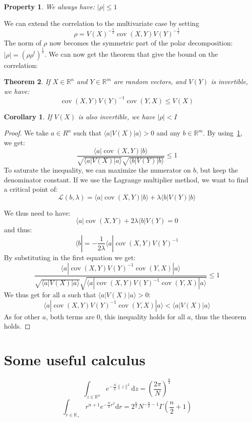 \documentclass[10pt,a4paper]{report}
\theoremstyle{plain}
\newtheorem{thm}{Theorem}[chapter]
\newtheorem{prop}[thm]{Property}
\newtheorem{cor}{Corollary}[thm]
\theoremstyle{definition}
\theoremstyle{remark}
\newcommand{\R}{\ensuremath{\mathbb{R}}}
\newcommand{\ket}[1]{|#1\rangle}
\newcommand{\bra}[1]{\langle#1|}
\newcommand{\dd}{\mathrm{d}}
\renewcommand{\leq}{\leqslant}
\DeclareMathOperator{\cov}{cov}
\begin{document}
\begin{prop}\label{prop:correl1}
  We always have: $|\rho| \le 1$
\end{prop}

We can extend the correlation to the multivariate case by setting
\[\rho = {V(X)}^{-\frac12}\cov(X,Y){V(Y)}^{-\frac12}\]
The norm of $\rho$ now becomes the symmetric part of the polar decomposition:  $|\rho|
= {(\rho\rho^t)}^{\frac12}$. We can now get the theorem that give the bound on the
correlation:

\begin{thm}\label{thm:correln}
  If $X \in \R^n$ and $Y \in \R^m$ are random vectors, and $V(Y)$ is invertible,
  we have:
  \[\cov(X,Y){V(Y)}^{-1}\cov(Y,X) \leq V(X)\]
\end{thm}

\begin{cor}
  If $V(X)$ is also invertible, we have $|\rho| < I$
\end{cor}

\begin{proof}
  We take $a \in R^n$ such that $\bra a V(X) \ket a > 0$ and any $b \in \R^m$.
  By using~\cref{prop:correl1}, we get:
  \[ \frac{ \bra a \cov(X,Y) \ket b}{\sqrt{\bra a V(X) \ket a}\sqrt{\bra b V(Y)
        \ket b}} \leq 1\]
  To saturate the inequality, we can maximize the numerator on $b$, but keep the
  denominator constant. If we use the Lagrange multiplier method, we want to
  find a critical point of:
  \[\mathcal{L}(b,\lambda) = \bra a \cov(X,Y) \ket b + \lambda \bra b V(Y) \ket
    b\]

  We thus need to have:
  \[ \bra a \cov(X,Y) + 2\lambda\bra b V(Y) = 0\]
  and thus:
  \[ \bra b = - \frac 1 {2\lambda} \bra a \cov(X,Y) {V(Y)}^{-1}\]
  By substituting in the first equation we get:
  \[ \frac{ \bra a \cov(X,Y) {V(Y)}^{-1} \cov(Y,X) \ket a}
    {\sqrt{\bra a V(X) \ket a}
      \sqrt{\bra a \cov(X,Y) {V(Y)}^{-1} \cov(Y,X) \ket a}} \leq 1\]
  We thus get for all $a$ such that $\bra a V(X) \ket a > 0$:
  \[ \bra a \cov(X,Y) {V(Y)}^{-1} \cov(Y,X) \ket a < \bra a V(X) \ket a\]
  As for other $a$, both terms are 0, this inequality holds for all $a$, thus
  the theorem holds.
\end{proof}




\chapter{Some useful calculus}


\begin{equation}\label{eqn:gaussdimn}
  \int_{z \in\R^n} e^{-\frac N2 \|z\|^2} \dd z = {\left(\frac
      {2\pi}{N}\right)}^{\frac n 2}
\end{equation}
\begin{equation}\label{eqn:gausspown}
  \int_{r \in\R_+} r^{n+1} e^{-\frac N2 r^2} \dd r = 2^{\frac n2}N^{-\frac n2
    -1}\Gamma\left(\frac n 2 + 1\right)
\end{equation}
\end{document}
